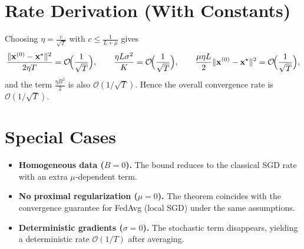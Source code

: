 \documentclass{article}
\begin{document}
\section*{Rate Derivation (With Constants)}
Choosing $\eta = \frac{c}{\sqrt{T}}$ with $c\le \frac{1}{L+\mu}$ gives
\[
\frac{\|\mathbf{x}^{(0)}-\mathbf{x}^{\star}\|^{2}}{2\eta T}
= \mathcal{O}\!\Bigl(\frac{1}{\sqrt{T}}\Bigr),\qquad
\frac{\eta L\sigma^{2}}{K}= \mathcal{O}\!\Bigl(\frac{1}{\sqrt{T}}\Bigr),\qquad
\frac{\mu\eta L}{2}\|\mathbf{x}^{(0)}-\mathbf{x}^{\star}\|^{2}= \mathcal{O}\!\Bigl(\frac{1}{\sqrt{T}}\Bigr),
\]
and the term $\frac{\eta B^{2}}{2}$ is also $\mathcal{O}(1/\sqrt{T})$. Hence the overall convergence rate is $\mathcal{O}(1/\sqrt{T})$.

\section*{Special Cases}
\begin{itemize}
\item \textbf{Homogeneous data ($B=0$).} The bound reduces to the classical SGD rate with an extra $\mu$‑dependent term.
\item \textbf{No proximal regularization ($\mu=0$).} The theorem coincides with the convergence guarantee for FedAvg (local SGD) under the same assumptions.
\item \textbf{Deterministic gradients ($\sigma=0$).} The stochastic term disappears, yielding a deterministic rate $\mathcal{O}(1/T)$ after averaging.
\end{itemize}
\end{document}
